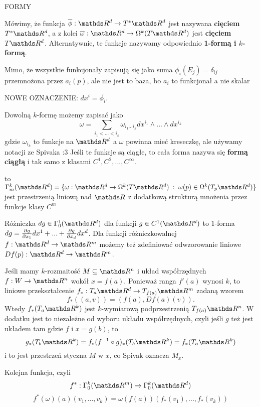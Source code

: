 \documentclass{article}
\begin{document}
{\large\color{def}FORMY}
\begin{description}
    \item Mówimy, że funkcja $\overline{\phi}:\R^d\to T^*\R^d$ jest nazywana \textbf{cięciem} $T^*\R^d$, a z kolei $\overline{\omega}:\R^d\to\Omega^k(T\R^d)$ jest \textbf{cięciem $T\R^d$}. Alternatywnie, te funkcje nazywamy odpowiednio \textbf{\color{acc}1-formą i $k$-formą}.   
    \item Mimo, że wszystkie funkcjonały zapisują się jako suma $\overline{\phi_i}(E_j)=\delta_{ij}$ przemnożona przez $a_i(p)$, ale nie jest to baza, bo $a_i$ to funkcjonał a nie skalar
    \item {\color{def}NOWE OZNACZENIE: $dx^i=\overline{\phi_i}$.}
    \item Dowolną $k$-formę możemy zapisać jako $$\omega=\sum\limits_{i_1<...<i_k}\omega_{i_1...i_k}dx^{i_1}\land ...\land dx^{i_k}$$ gdzie $\omega_{i_k}$ to funkcje na $\R^d$ a $\omega$ powinna mieć kreseczkę, ale używamy notacji ze Spivaka :3 Jeśli te funkcje są ciągłe, to cała forma nazywa się \textbf{\color{acc}formą ciągłą} i tak samo z klasami $C^1,C^2,...,C^\infty$.
    \item [Przestrzeń $k$-form klasy $C^m$] to $\Gamma^k_m(\R^d)=\{\omega:\R^d\to\Omega^k(T\R^d)\;:\;\omega(p)\in\Omega^k(T_p\R^d)\}$ jest przestrzenią liniową nad $\R$ z dodatkową strukturą mnożenia przez funkcje klasy $C^m$
\end{description}

{\color{def}Różniczka $dg\in\Gamma^1_0(\R^d)$} dla funkcji $g\in C^1(\R^d)$ to $1$-forma $dg={\partial g\over \partial x_1}dx^1+...+{\partial g\over \partial x_d}dx^d$. Dla funkcji różniczkowalnej $f:\R^d\to\R^m$ możemy też zdefiniować odwzorowanie liniowe $Df(p):\R^d\to\R^m$.

Jeśli mamy $k$-rozmaitość $M\subseteq\R^n$ i układ współrzędnych $f:W\to\R^n$ wokół $x=f(a)$. Ponieważ ranga $f'(a)$ wynosi $k$, to liniowe przekształcenie $f_*:T_a\R^d\to T_{f(a)}\R^m$ zadaną wzorem
$$f_*((a,v))=(f(a), Df(a)(v)).$$
Wtedy $f_*(T_a\R^k)$ jest $k$-wymiarową podprzestrzenią $T_{f(a)}\R^n$. W dodatku jest to niezależne od wyboru układu współrzędnych, czyli jeśli $g$ też jest układem tam gdzie $f$ i $x=g(b)$, to 
$$g_*(T_b\R^k)=f_*(f^{-1}\circ g)_*(T_b\R^k)=f_*(T_a\R^k)$$
i to jest przestrzeń styczna $M$ w $x$, co Spivak oznacza $M_x$.
\smallskip

Kolejna funkcja, czyli 
$$f^*:\Gamma^k_0(\R^m)\to\Gamma_0^k(\R^d)$$
$$f^*(\omega)(a)(v_1,...,v_k)=\omega(f(a))(f_*(v_1),...,f_*(v_k))$$
\end{document}
